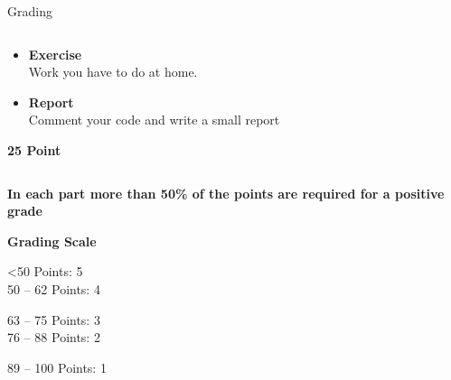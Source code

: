 \documentclass[aspectratio=169]{beamer}
\begin{document}
\begin{frame}{Grading}
\begin{columns}
\begin{column}{0.32\textwidth}
\begin{coloredblock}[blue][Homework 2][\footnotesize\centering][][6.5cm]
\begin{itemize}
                    \item \footnotesize \textbf{Exercise}\\
                    Work you have to do at home.
                    \item \footnotesize \textbf{Report}\\
                    Comment your code and write a small report
                \end{itemize}
            \end{coloredblock}
            \centering \footnotesize \textbf{25 Point}
        \end{column}
    \end{columns}
    \vspace{0.7cm}
    \begin{coloredblock}[yellow]
        \centering\footnotesize\textbf{In each part more than 50\% of the points are required for a positive grade}
    \end{coloredblock}

    \vspace{0.2cm}
    \begin{coloredblock}[green]
        \begin{minipage}[c]{0.24\textwidth}
            \centering\footnotesize \textbf{Grading Scale}
        \end{minipage}
        \hfill
        \begin{minipage}[c]{0.24\textwidth}
            \footnotesize
            <50 Points:         5\\
            50 – 62 Points:     4
        \end{minipage}
        \hfill
        \begin{minipage}[c]{0.24\textwidth}
            \footnotesize
            63 – 75 Points:     3\\
            76 – 88 Points:     2
        \end{minipage}
        \hfill
        \begin{minipage}[t]{0.24\textwidth}
            \footnotesize
            89 – 100 Points:    1
        \end{minipage}
        
    \end{coloredblock}


\end{frame}
\end{document}
